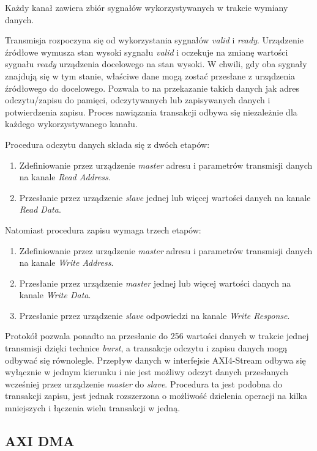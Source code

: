 Każdy kanał zawiera zbiór sygnałów wykorzystywanych w trakcie wymiany danych.

Transmisja rozpoczyna się od wykorzystania sygnałów \emph{valid} i \emph{ready}. 
Urządzenie źródłowe wymusza stan wysoki sygnału \emph{valid} i oczekuje na zmianę wartości sygnału \emph{ready} urządzenia docelowego na stan wysoki. 
W chwili, gdy oba sygnały znajdują się w tym stanie, właściwe dane mogą zostać przesłane z urządzenia źródłowego do docelowego. 
Pozwala to na przekazanie takich danych jak adres odczytu/zapisu do pamięci, odczytywanych lub zapisywanych danych i potwierdzenia zapisu. 
Proces nawiązania transakcji odbywa się niezależnie dla każdego wykorzystywanego kanału.

Procedura odczytu danych składa się z dwóch etapów:
\begin{enumerate}
	\item Zdefiniowanie  przez urządzenie \emph{master} adresu i parametrów transmisji danych na kanale \emph{Read Address}.
	\item Przesłanie przez urządzenie \emph{slave} jednej lub więcej wartości danych na kanale \emph{Read Data}.
\end{enumerate}

Natomiast procedura zapisu wymaga trzech etapów:
\begin{enumerate}
	\item Zdefiniowanie  przez urządzenie \emph{master} adresu i parametrów transmisji danych na kanale \emph{Write Address}.
	\item Przesłanie przez urządzenie \emph{master} jednej lub więcej wartości danych na kanale \emph{Write Data}.
	\item Przesłanie przez urządzenie \emph{slave} odpowiedzi na kanale \emph{Write Response}.
\end{enumerate}

Protokół pozwala ponadto na przesłanie do 256 wartości danych w trakcie jednej transmisji dzięki technice \emph{burst}, a transakcje odczytu i zapisu danych mogą odbywać się równolegle.
Przepływ danych w interfejsie AXI4-Stream odbywa się wyłącznie w jednym kierunku i nie jest możliwy odczyt danych przesłanych wcześniej przez urządzenie \emph{master} do \emph{slave}. 
Procedura ta jest podobna do transakcji zapisu, jest jednak rozszerzona o możliwość dzielenia operacji na kilka mniejszych i łączenia wielu transakcji w jedną.

\subsection{AXI DMA}

